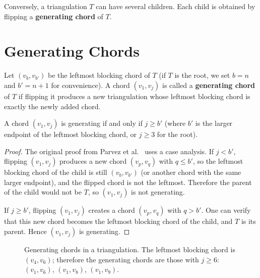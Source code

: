 Conversely, a triangulation \(T\) can have several children. 
Each child is obtained by flipping a \textbf{generating chord} of \(T\).

\section{Generating Chords}
\label{sec:generating_chords_cycle}

Let \((v_b, v_{b'})\) be the leftmost blocking chord of \(T\) (if \(T\) is the root, we set \(b = n\) and \(b' = n+1\) for convenience). 
A chord \((v_1, v_j)\) is called a \textbf{generating chord} of \(T\) if flipping it produces a new triangulation whose leftmost blocking chord is exactly the newly added chord.

\begin{lemma}
    A chord \((v_1, v_j)\) is generating if and only if \(j \ge b'\) (where \(b'\) is the larger endpoint of the leftmost blocking chord, or \(j \ge 3\) for the root).
\end{lemma}

\begin{proof}
    The original proof from Parvez et al.~\cite{parvez2011} uses a case analysis. 
    If \(j < b'\), flipping \((v_1, v_j)\) produces a new chord \((v_p, v_q)\) with \(q \le b'\), so the leftmost blocking chord of the child is still \((v_b, v_{b'})\) (or another chord with the same larger endpoint), and the flipped chord is not the leftmost. 
    Therefore the parent of the child would not be \(T\), so \((v_1, v_j)\) is not generating.

    If \(j \ge b'\), flipping \((v_1, v_j)\) creates a chord \((v_p, v_q)\) with \(q > b'\). 
    One can verify that this new chord becomes the leftmost blocking chord of the child, and \(T\) is its parent. 
    Hence \((v_1, v_j)\) is generating.
\end{proof}

\begin{figure}[htbp]
    \centering
    \caption{Generating chords in a triangulation. The leftmost blocking chord is \((v_4, v_6)\); therefore the generating chords are those with \(j \ge 6\): \((v_1, v_6)\), \((v_1, v_8)\), \((v_1, v_9)\).}
    \label{fig:generating_chords}
\end{figure}

